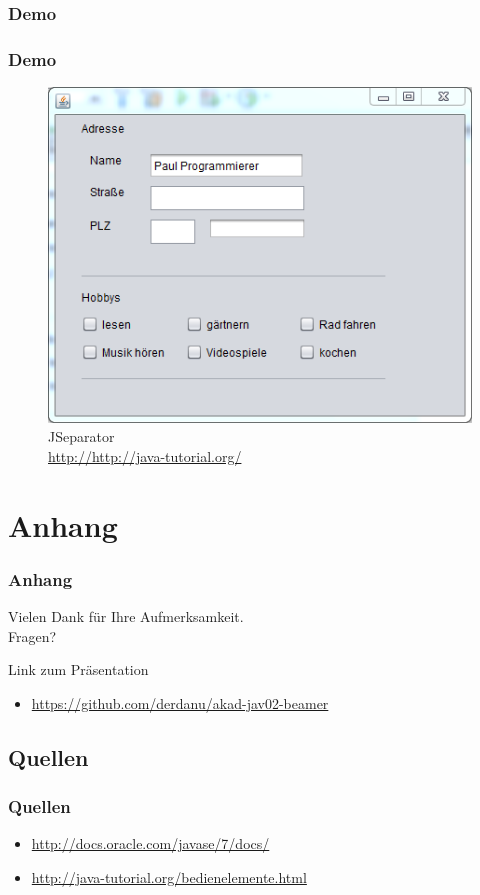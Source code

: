 \documentclass[xcolor=dvipsnames]{beamer}
\begin{document}
\subsubsection{Demo}
\begin{frame}
  \frametitle{Demo}
	\begin{figure}
		\includegraphics[scale=0.6]{images/jseparator.PNG}
		\caption{JSeparator \\ \tiny{\textcolor{gray}{\url{http://http://java-tutorial.org/}}}}
		\end{figure}
\end{frame}

\section{Anhang}
\begin{frame}
  \frametitle{Anhang} %
	\begin{block}{}	
		\begin{center}
			Vielen Dank für Ihre Aufmerksamkeit. \\
			Fragen?
		\end{center}	
	\end{block}
	\begin{block}{Link zum Präsentation}	
		\begin{itemize}
			\item \url{https://github.com/derdanu/akad-jav02-beamer}
		\end{itemize}
	\end{block}
\end{frame}

\subsection{Quellen}
\begin{frame} %
  \frametitle{Quellen} %
 	\begin{itemize}
		\item \url{http://docs.oracle.com/javase/7/docs/}	
		\item \url{http://java-tutorial.org/bedienelemente.html}
	\end{itemize}
\end{frame}
\end{document}
